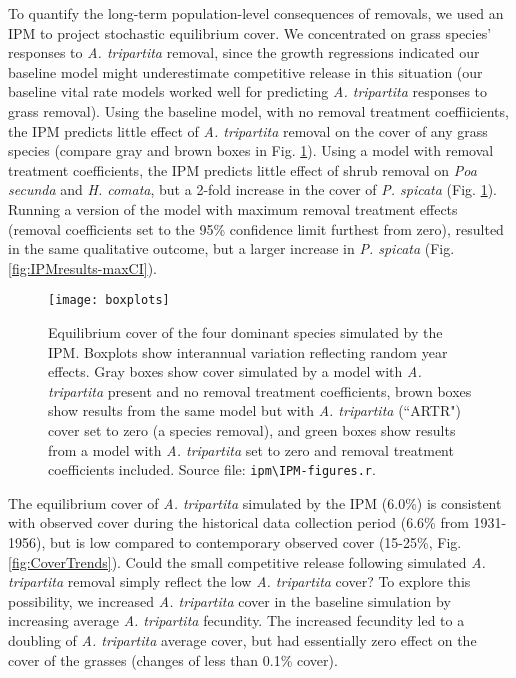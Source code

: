 \documentclass[11pt]{article}
\begin{document}
\begin{doublespacing}
To quantify the long-term population-level consequences of removals, we used an IPM to project stochastic equilibrium cover. We concentrated on grass species' responses to \textit{A. tripartita} removal, since the growth regressions indicated our baseline model might underestimate competitive release in this situation (our baseline vital rate models worked well for predicting \textit{A. tripartita} responses to grass removal). Using the baseline model, with no removal treatment coeffiicients, the IPM predicts little effect of \textit{A. tripartita} removal on the cover of any grass species (compare gray and brown boxes in Fig. \ref{fig:IPMresults}). Using a model with removal treatment coefficients, the IPM predicts little effect of shrub removal on \textit{Poa secunda} and \textit{H. comata}, but a 2-fold increase in the cover of \textit{P. spicata} (Fig. \ref{fig:IPMresults}). Running a version of the model with maximum removal treatment effects (removal coefficients set to the 95\% confidence limit furthest from zero), resulted in the same qualitative outcome, but a larger increase in \textit{P. spicata} (Fig. \ref{fig:IPMresults-maxCI}). 

 \begin{figure}[tbp]
 \centering
 \texttt{[image: boxplots]}
 \caption{Equilibrium cover of the four dominant species simulated by the IPM. Boxplots show interannual variation reflecting random year effects. Gray boxes show cover simulated by a model with \textit{A. tripartita} present and no removal treatment coefficients, brown boxes show results from the same model but with \textit{A. tripartita} (``ARTR") cover set to zero (a species removal), and green boxes show results from a model with  \textit{A. tripartita} set to zero and removal treatment coefficients included. Source file: \texttt{ipm\textbackslash IPM-figures.r}.}
 \label{fig:IPMresults}
 \end{figure}
 
 The equilibrium cover of \textit{A. tripartita} simulated by the IPM (6.0\%) is consistent with observed cover during the historical data collection period (6.6\% from 1931-1956), but is low compared to contemporary observed cover (15-25\%, Fig. \ref{fig:CoverTrends}). Could the small competitive release following simulated \textit{A. tripartita} removal simply reflect the low \textit{A. tripartita} cover? To explore this possibility, we increased \textit{A. tripartita} cover in the baseline simulation by increasing average \textit{A. tripartita} fecundity. The increased fecundity led to a doubling of \textit{A. tripartita} average cover, but had essentially zero effect on the cover of the grasses (changes of less than 0.1\% cover). 


\end{doublespacing}
\end{document}
